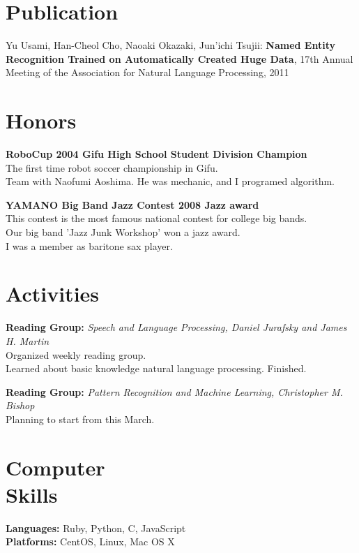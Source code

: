 \documentclass[margin]{res}
\begin{document}
\begin{resume}
\section{Publication}
Yu Usami, Han-Cheol Cho, Naoaki Okazaki, Jun'ichi Tsujii: \textbf{Named Entity Recognition Trained on Automatically Created Huge Data}, 17th Annual Meeting of the Association for Natural Language Processing, 2011 

\section{Honors}
\textbf{RoboCup 2004 Gifu High School Student Division Champion} \\
The first time robot soccer championship in Gifu. \\
Team with Naofumi Aoshima. He was mechanic, and I programed algorithm.

\textbf{YAMANO Big Band Jazz Contest 2008 Jazz award} \\
This contest is the most famous national contest for college big bands.\\
Our big band 'Jazz Junk Workshop' won a jazz award. \\
I was a member as baritone sax player.

\section{Activities}
\textbf{Reading Group:} {\sl Speech and Language Processing, Daniel Jurafsky and James H. Martin} \\
Organized weekly reading group. \\
Learned about basic knowledge natural language processing. Finished.

\textbf{Reading Group:} {\sl Pattern Recognition and Machine Learning, Christopher M. Bishop} \\
Planning to start from this March.

\section{Computer \\ Skills}
\textbf{Languages:} Ruby, Python, C, JavaScript \\
\textbf{Platforms:} CentOS, Linux, Mac OS X \\ 
\end{resume}
\end{document}
